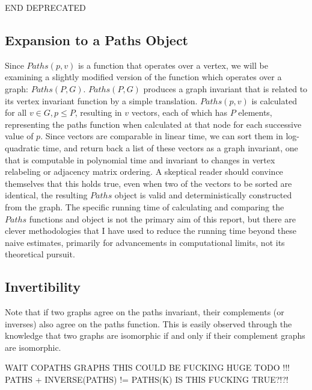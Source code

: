 \documentclass[11pt,a4paper]{report}
\begin{document}
END DEPRECATED 

\subsection{Expansion to a Paths Object}

Since \(Paths(p, v)\) is a function that operates over a vertex, we will be examining a slightly modified version of the function which operates over a graph: \(Paths(P, G)\).  \(Paths(P, G)\) produces a graph invariant that is related to its vertex invariant function by a simple translation.  \(Paths(p, v)\) is calculated for all \(v\in G, p \leq P\), resulting in \(v\) vectors, each of which has \(P\) elements, representing the paths function when calculated at that node for each successive value of \(p\). Since vectors are comparable in linear time, we can sort them in log-quadratic time, and return back a list of these vectors as a graph invariant, one that is computable in polynomial time and invariant to changes in vertex relabeling or adjacency matrix ordering. A skeptical reader should convince themselves that this holds true, even when two of the vectors to be sorted are identical, the resulting \(Paths\) object is valid and deterministically constructed from the graph.  The specific running time of calculating and comparing the \(Paths\) functions and object is not the primary aim of this report, but there are clever methodologies that I have used to reduce the running time beyond these naive estimates, primarily for advancements in computational limits, not its theoretical pursuit.



\subsection{Invertibility}
Note that if two graphs agree on the paths invariant, their complements (or inverses) also agree on the paths function.
This is easily observed through the knowledge that two graphs are isomorphic if and only if their complement graphs are isomorphic.

WAIT COPATHS GRAPHS THIS COULD BE FUCKING HUGE
TODO !!! PATHS + INVERSE(PATHS) != PATHS(K)
IS THIS FUCKING TRUE?!?!
\end{document}
